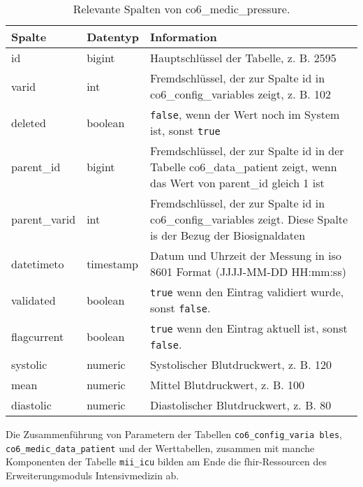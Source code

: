 \begin{longtable}{|l|l|p{8cm}|}
	\caption[Relevante Spalten von co6\_medic\_pressure]{Relevante Spalten von co6\_medic\_pressure.}
	\label{tab:valuepress}
	\endfirsthead
		\hline
		\bfseries Spalte & \bfseries Datentyp & \bfseries Information \\ \hline
		id & bigint & Hauptschlüssel der Tabelle, z. B. 2595 \\ \hline
		varid & int & Fremdschlüssel, der zur Spalte id in co6\_config\_variables zeigt, z. B. 102 \\ \hline
		deleted & boolean & \texttt{false}, wenn der Wert noch im System ist, sonst \texttt{true} \\ \hline
		parent\_id & bigint & Fremdschlüssel, der zur Spalte id in der Tabelle co6\_data\_patient zeigt, wenn das Wert von parent\_id gleich 1 ist \\ \hline
		parent\_varid & int & Fremdschlüssel, der zur Spalte id in co6\_config\_variables zeigt. Diese Spalte is der Bezug der Biosignaldaten \\ \hline
		datetimeto & timestamp & Datum und Uhrzeit der Messung in \acs{iso} 8601 Format (JJJJ-MM-DD HH:mm:ss)\\ \hline
		validated & boolean & \texttt{true} wenn den Eintrag validiert wurde, sonst \texttt{false}. \\ \hline
		flagcurrent & boolean & \texttt{true} wenn den Eintrag aktuell ist, sonst \texttt{false}. \\ \hline
		systolic & numeric & Systolischer Blutdruckwert, z. B. 120 \\ \hline
		mean & numeric & Mittel Blutdruckwert, z. B. 100 \\ \hline
		diastolic & numeric & Diastolischer Blutdruckwert, z. B. 80 \\ \hline
\end{longtable}

\newpage

Die Zusammenführung von Parametern der Tabellen \texttt{co6\_config\_varia bles}, \texttt{co6\_medic\_data\_patient} und der Werttabellen, zusammen mit manche Komponenten der Tabelle \texttt{mii\_icu} bilden am Ende die \ac{fhir}-Ressourcen des Erweiterungsmoduls \glqq Intensivmedizin\grqq{} ab.